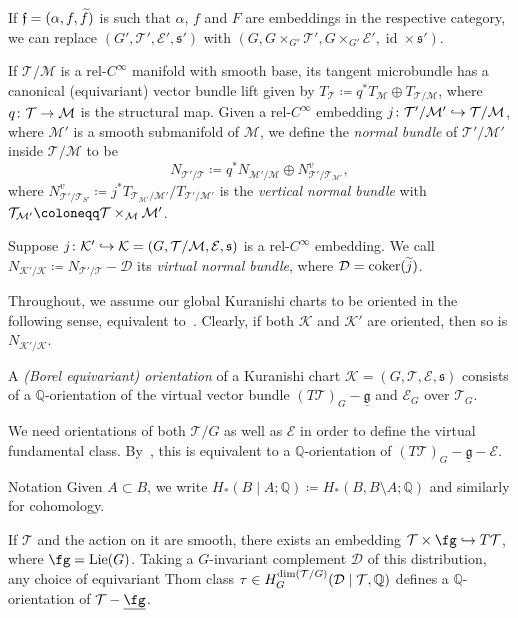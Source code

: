 \documentclass[AHL,Unicode,longabstracts]{cedram}
\newcommand{\sub}{\subset}
\newcommand{\sm}{\ensuremath{\setminus}}
\newcommand{\cl}{\colon}
\newcommand{\dsm}{\oplus}
\newcommand{\lc}{\underline}
\newcommand{\bQ}{\mathbb{Q}}
\newcommand{\cD}{\mathcal{D}}
\newcommand{\cE}{\mathcal{E}}
\newcommand{\cK}{\mathcal{K}}
\newcommand{\cM}{\mathcal{M}}
\newcommand{\cT}{\mathcal{T}}
\newcommand{\ff}{\mathfrak{f}}
\newcommand{\fs}{\mathfrak{s}}
\newcommand{\gk}{\mathfrak{g}}
\DeclareMathOperator{\ide}{id}
\DeclareMathOperator{\coker}{coker}
\DeclareMathOperator{\Lie}{Lie}
\newcommand{\hkra}{\hookrightarrow}
\renewcommand*{\to}{\mathchoice{\longrightarrow}{\rightarrow}{\rightarrow}{\rightarrow}}
\newcommand{\longhookrightarrow}{\lhook\joinrel\longrightarrow}
\newcommand*{\hookto}{\mathchoice{\longhookrightarrow}{\hookrightarrow}{\hookrightarrow}{\hookrightarrow}}
\let\oldin\in
\renewcommand{\in}{\mathchoice{\oldin}{\oldin}{\,\oldin\,}{\,\oldin\,}}
\let\oldtilde\tilde
\renewcommand*{\tilde}[1]{\mathchoice{\widetilde{#1}}{\widetilde{#1}}{\oldtilde{#1}}{\oldtilde{#1}}}
\begin{document}
\begin{rema}
If $\ff = (\alpha,f,\tilde{f})$ is such that $\alpha$, $f$ and $F$ are embeddings in the respective category, we can replace $(G',\cT',\cE',\fs')$ with $(G,G\times_{G'} \cT', G\times_{G'} \cE',\ide\times\fs')$.
\end{rema}

If $\cT/\cM$ is a rel-$C^\infty$ manifold with smooth base, its tangent microbundle has a canonical (equivariant) vector bundle lift given by $T_\cT\coloneqq q^*T_\cM\dsm T_{\cT/\cM}$, where $q\cl \cT\to \cM$ is the structural map. Given a rel-$C^\infty$ embedding $j\cl \cT'/\cM' \hookto \cT/\cM$, where $\cM'$ is a smooth submanifold of $\cM$, we define the \emph{normal bundle} of $\cT'/\cM'$ inside $\cT/\cM$ to be
\[
N_{\cT'/\cT} \coloneqq q^*N_{\cM'/\cM} \oplus N^v_{\cT'/\cT_{\cM'}},
\]
where $N^v_{\cT'/\cT_{S'}} \coloneqq j^*T_{\cT_{\cM'}/\cM'}/T_{\cT'/\cM'}$ is the \emph{vertical normal bundle} with $\cT_{\cM'} \coloneqq\linebreak \cT\times_\cM\cM'$.

\begin{defi}\label{Virtual Normal Bundle}
Suppose $j \cl \cK'\hookto \cK = (G,\cT/\cM,\cE,\fs)$ is a rel-$C^\infty$ embedding. We call $ N_{\cK'/\cK}\coloneqq N_{\cT'/\cT} - \cD$
its \emph{virtual normal bundle}, where $\cD= \coker(\tilde{j})$.
\end{defi}

Throughout, we assume our global Kuranishi charts to be oriented in the following sense, equivalent to~\cite[Section~5.4]{AMS21}. Clearly, if both $\cK$ and $\cK'$ are oriented, then so is $N_{\cK'/\cK}$.

\begin{defi}
A \emph{(Borel equivariant) orientation} of a Kuranishi chart $\cK= (G,\cT,\cE,\fs)$ consists of a $\bQ$-orientation of the virtual vector bundle $(T\cT)_G - \lc{\gk}$ and $\cE_G$ over $\cT_G$.
\end{defi}

We need orientations of both $\cT/G$ as well as $\cE$ in order to define the virtual fundamental class. By~\cite[Lemma~5.11]{AMS21}, this is equivalent to a $\bQ$-orientation of $(T\cT)_G - \lc{\gk}-\cE$.

\begin{enonce*}
{Notation }
Given $A\sub B$, we write $H_*(B\mid A;\bQ) \coloneqq H_*(B,B\sm A;\bQ)$ and similarly for cohomology.
\end{enonce*}

\begin{exam}
If $\cT$ and the action on it are smooth, there exists an embedding $\cT\times\fg\hkra T\cT$, where $\fg = \Lie(G)$. Taking a $G$-invariant complement $\cD$ of this distribution, any choice of equivariant Thom class $\tau \in H^{\dim(\cT/G)}_G(\cD\mid\cT,\bQ)$ defines a $\bQ$-orientation of $\cT-\lc{\fg}$.
\end{exam}
\end{document}
